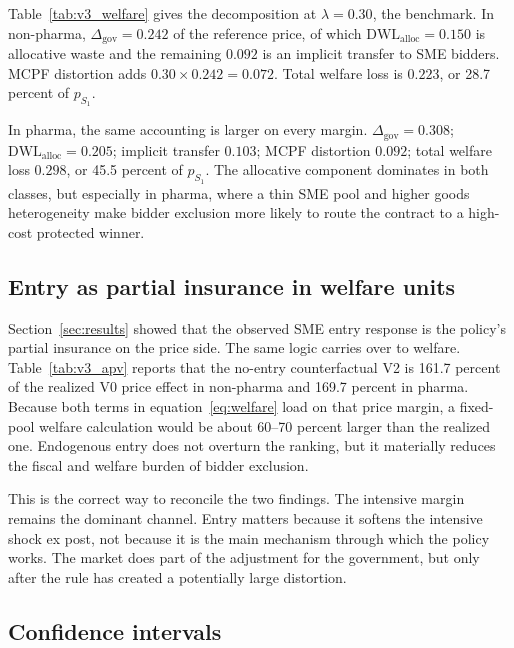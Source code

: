 Table~\ref{tab:v3_welfare} gives the decomposition at $\lambda = 0.30$, the \citet{ballard1985} benchmark. In non-pharma, $\Delta_{\text{gov}} = 0.242$ of the reference price, of which $\mathrm{DWL}_{\text{alloc}} = 0.150$ is allocative waste and the remaining $0.092$ is an implicit transfer to SME bidders. MCPF distortion adds $0.30 \times 0.242 = 0.072$. Total welfare loss is $0.223$, or 28.7 percent of $p_{S_1}$.

In pharma, the same accounting is larger on every margin. $\Delta_{\text{gov}} = 0.308$; $\mathrm{DWL}_{\text{alloc}} = 0.205$; implicit transfer $0.103$; MCPF distortion $0.092$; total welfare loss $0.298$, or 45.5 percent of $p_{S_1}$. The allocative component dominates in both classes, but especially in pharma, where a thin SME pool and higher goods heterogeneity make bidder exclusion more likely to route the contract to a high-cost protected winner.

\subsection{Entry as partial insurance in welfare units}

Section~\ref{sec:results} showed that the observed SME entry response is the policy's partial insurance on the price side. The same logic carries over to welfare. Table~\ref{tab:v3_apv} reports that the no-entry counterfactual V2 is 161.7 percent of the realized V0 price effect in non-pharma and 169.7 percent in pharma. Because both terms in equation~\eqref{eq:welfare} load on that price margin, a fixed-pool welfare calculation would be about 60--70 percent larger than the realized one. Endogenous entry does not overturn the ranking, but it materially reduces the fiscal and welfare burden of bidder exclusion.

This is the correct way to reconcile the two findings. The intensive margin remains the dominant channel. Entry matters because it softens the intensive shock ex post, not because it is the main mechanism through which the policy works. The market does part of the adjustment for the government, but only after the rule has created a potentially large distortion.

\subsection{Confidence intervals}

